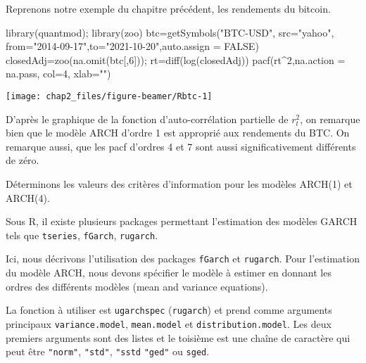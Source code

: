 \documentclass[
  ignorenonframetext,
]{beamer}
\newenvironment{Shaded}{\begin{snugshade}}{\end{snugshade}}
\newcommand{\AttributeTok}[1]{\textcolor[rgb]{0.77,0.63,0.00}{#1}}
\newcommand{\ConstantTok}[1]{\textcolor[rgb]{0.00,0.00,0.00}{#1}}
\newcommand{\DecValTok}[1]{\textcolor[rgb]{0.00,0.00,0.81}{#1}}
\newcommand{\FunctionTok}[1]{\textcolor[rgb]{0.00,0.00,0.00}{#1}}
\newcommand{\NormalTok}[1]{#1}
\newcommand{\OtherTok}[1]{\textcolor[rgb]{0.56,0.35,0.01}{#1}}
\newcommand{\SpecialCharTok}[1]{\textcolor[rgb]{0.00,0.00,0.00}{#1}}
\newcommand{\StringTok}[1]{\textcolor[rgb]{0.31,0.60,0.02}{#1}}
\begin{document}
\begin{frame}[fragile]
Reprenons notre exemple du chapitre précédent, les rendements du
bitcoin.

\begin{Shaded}
\begin{Highlighting}[]
\FunctionTok{library}\NormalTok{(quantmod); }\FunctionTok{library}\NormalTok{(zoo)}
\NormalTok{btc}\OtherTok{=}\FunctionTok{getSymbols}\NormalTok{(}\StringTok{"BTC{-}USD"}\NormalTok{, }\AttributeTok{src=}\StringTok{"yahoo"}\NormalTok{, }\AttributeTok{from=}\StringTok{"2014{-}09{-}17"}\NormalTok{,}\AttributeTok{to=}\StringTok{"2021{-}10{-}20"}\NormalTok{,}\AttributeTok{auto.assign =} \ConstantTok{FALSE}\NormalTok{)}
\NormalTok{closedAdj}\OtherTok{=}\FunctionTok{zoo}\NormalTok{(}\FunctionTok{na.omit}\NormalTok{(btc[,}\DecValTok{6}\NormalTok{])); rt}\OtherTok{=}\FunctionTok{diff}\NormalTok{(}\FunctionTok{log}\NormalTok{(closedAdj))}
\FunctionTok{pacf}\NormalTok{(rt}\SpecialCharTok{\^{}}\DecValTok{2}\NormalTok{,}\AttributeTok{na.action =}\NormalTok{ na.pass, }\AttributeTok{col=}\DecValTok{4}\NormalTok{, }\AttributeTok{xlab=}\StringTok{""}\NormalTok{)}
\end{Highlighting}
\end{Shaded}

\begin{center}\texttt{[image: chap2\_files/figure-beamer/Rbtc-1]} \end{center}
\end{frame}

\begin{frame}[fragile]
D'après le graphique de la fonction d'auto-corrélation partielle de
\(r_t^2\), on remarque bien que le modèle ARCH d'ordre 1 est approprié
aux rendements du BTC. On remarque aussi, que les pacf d'ordres 4 et 7
sont aussi significativement différents de zéro.

Déterminons les valeurs des critères d'information pour les modèles
ARCH(1) et ARCH(4).

Sous R, il existe plusieurs packages permettant l'estimation des modèles
GARCH tels que \texttt{tseries}, \texttt{fGarch}, \texttt{rugarch}.

Ici, nous décrivons l'utilisation des packages \texttt{fGarch} et
\texttt{rugarch}. Pour l'estimation du modèle ARCH, nous devons
spécifier le modèle à estimer en donnant les ordres des différents
modèles (mean and variance equations).

La fonction à utiliser est \texttt{ugarchspec} (\texttt{rugarch}) et
prend comme arguments principaux \texttt{variance.model},
\texttt{mean.model} et \texttt{distribution.model}. Les deux premiers
arguments sont des listes et le toisième est une chaîne de caractère qui
peut être \texttt{"norm"}, \texttt{"std"}, \texttt{"sstd} \texttt{"ged"}
ou \texttt{sged}.
\end{frame}
\end{document}
